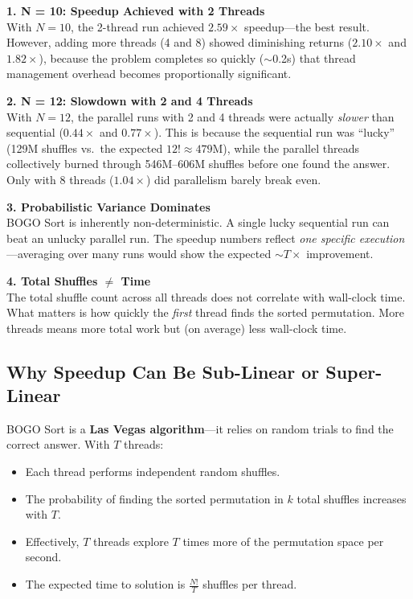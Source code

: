 \documentclass[11pt]{article}
\begin{document}
\begin{shadedbox}
\textbf{1. N = 10: Speedup Achieved with 2 Threads} \\
With $N = 10$, the 2-thread run achieved $2.59\times$ speedup---the best result. However, adding more threads (4 and 8) showed diminishing returns ($2.10\times$ and $1.82\times$), because the problem completes so quickly ($\sim$0.2s) that thread management overhead becomes proportionally significant.

\vspace{6pt}
\textbf{2. N = 12: Slowdown with 2 and 4 Threads} \\
With $N = 12$, the parallel runs with 2 and 4 threads were actually \textit{slower} than sequential ($0.44\times$ and $0.77\times$). This is because the sequential run was ``lucky'' (129M shuffles vs.~the expected $12! \approx 479$M), while the parallel threads collectively burned through 546M--606M shuffles before one found the answer. Only with 8 threads ($1.04\times$) did parallelism barely break even.

\vspace{6pt}
\textbf{3. Probabilistic Variance Dominates} \\
BOGO Sort is inherently non-deterministic. A single lucky sequential run can beat an unlucky parallel run. The speedup numbers reflect \textit{one specific execution}---averaging over many runs would show the expected $\sim T\times$ improvement.

\vspace{6pt}
\textbf{4. Total Shuffles $\neq$ Time} \\
The total shuffle count across all threads does not correlate with wall-clock time. What matters is how quickly the \textit{first} thread finds the sorted permutation. More threads means more total work but (on average) less wall-clock time.
\end{shadedbox}

\subsection{Why Speedup Can Be Sub-Linear or Super-Linear}

BOGO Sort is a \textbf{Las Vegas algorithm}---it relies on random trials to find the correct answer. With $T$ threads:

\begin{itemize}
    \item Each thread performs independent random shuffles.
    \item The probability of finding the sorted permutation in $k$ total shuffles increases with $T$.
    \item Effectively, $T$ threads explore $T$ times more of the permutation space per second.
    \item The expected time to solution is $\frac{N!}{T}$ shuffles per thread.
\end{itemize}
\end{document}
